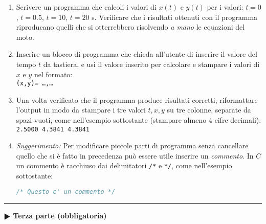 \documentclass[11pt]{article}
\begin{document}
\begin{enumerate}
\item Scrivere un programma che calcoli i valori di $x(t)$ e $y(t)$ per i valori: $t=0$, $t=0.5$, $t=10$, $t=20$ s.
Verificare che i risultati ottenuti con il programma riproducano quelli che si otterrebbero risolvendo {\em a mano\/} le equazioni del moto.

\item Inserire un blocco di programma che chieda all'utente di inserire il valore del tempo $t$ da tastiera, e usi il valore inserito per calcolare e stampare i valori di $x$ e $y$ nel formato:
  \\
  \texttt{(x,y)= \ldots,\ldots}
  
\item Una volta verificato che il programma produce risultati corretti, riformattare
  l'output in modo da stampare i tre valori $t,x,y$ su tre colonne, separate da spazi vuoti, come nell'esempio sottostante (stampare almeno 4 cifre decimali):
  \\
  \texttt{2.5000    4.3841    4.3841}%
\item {\em Suggerimento:\/} Per modificare piccole parti di programma senza cancellare quello che
  si \`e fatto in precedenza pu\`o essere utile inserire un {\em commento}.
  In $C$ un commento \`e racchiuso dai delimitatori \texttt{/*} e  \texttt{*/}, come nell'esempio
  sottostante:
  \begin{lstlisting}[language=c,numbers=none]
  /* Questo e' un commento */
\end{lstlisting}
\end{enumerate}


\hrule
\vspace{1mm}
\textbf{$\RHD$ Terza parte (obbligatoria)} 
\end{document}
